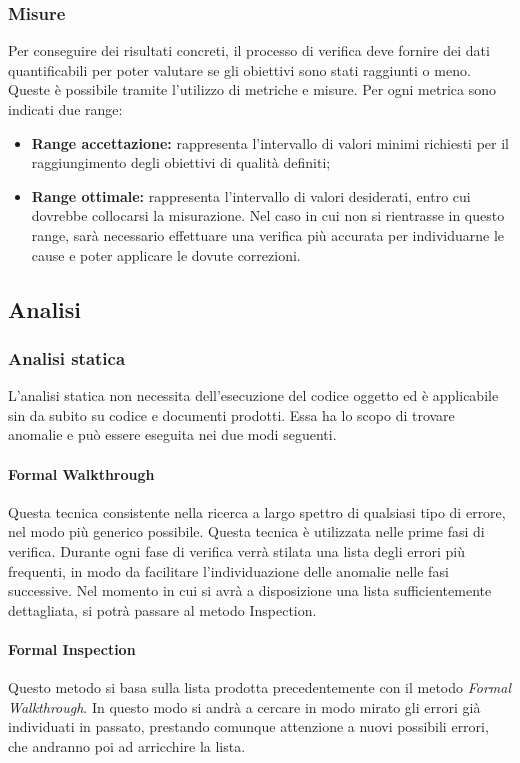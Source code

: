 		\subsubsection{Misure}
		Per conseguire dei risultati concreti, il processo di verifica deve fornire dei dati quantificabili per poter valutare se gli obiettivi sono stati raggiunti o meno. Queste è possibile tramite l’utilizzo di metriche e misure. Per ogni metrica sono indicati due range:
		\begin{itemize}
			\item \textbf{Range accettazione:} rappresenta l'intervallo di valori minimi richiesti per il raggiungimento degli obiettivi di qualità definiti;
			\item \textbf{Range ottimale:} rappresenta l'intervallo di valori desiderati, entro cui dovrebbe collocarsi la misurazione. Nel caso in cui non si rientrasse in questo range, sarà necessario effettuare una verifica più accurata per individuarne le cause e poter applicare le dovute correzioni.
		\end{itemize}
	
	\subsection{Analisi}
	
	\subsubsection{Analisi statica}
	L'analisi statica non necessita dell'esecuzione del codice oggetto ed è applicabile sin da subito su codice e documenti prodotti. Essa ha lo scopo di trovare anomalie e può essere eseguita nei due modi seguenti.
	
	\paragraph{Formal Walkthrough}
	Questa tecnica consistente nella ricerca a largo spettro di qualsiasi tipo di errore, nel modo più generico possibile. 
	Questa tecnica è utilizzata nelle prime fasi di verifica. Durante ogni fase di verifica verrà stilata una lista degli errori più frequenti, in modo da facilitare l’individuazione delle anomalie nelle fasi successive. 
	Nel momento in cui si avrà a disposizione una lista sufficientemente dettagliata, si potrà passare al metodo Inspection.
	
	
	\paragraph{Formal Inspection}
	Questo metodo si basa sulla lista prodotta precedentemente con il metodo \textit{Formal Walkthrough}. In questo modo si andrà a cercare in modo mirato gli errori già individuati in passato, prestando comunque attenzione a nuovi possibili errori, che andranno poi ad arricchire la lista.
	
